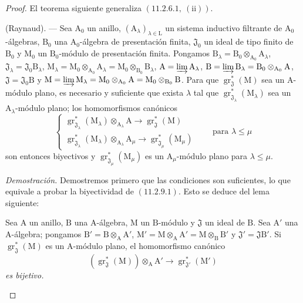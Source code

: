 \begin{proof}
El teorema siguiente generaliza $(11.2.6.1,~(\mathrm{ii}))$.

\begin{theorem}[11.2.9]
\label{IV.11.2.9}
(Raynaud). --- Sea $\mathrm{A}_0$ un anillo, $(\mathrm{A}_\lambda)_{\lambda\in\mathrm{L}}$ un sistema inductivo filtrante de $\mathrm{A}_0$-álgebras, $\mathrm{B}_0$ una $\mathrm{A}_0$-álgebra de presentación finita, $\mathfrak{J}_0$ un ideal de tipo finito de $\mathrm{B}_0$ y $\mathrm{M}_0$ un $\mathrm{B}_0$-módulo de presentación finita. Pongamos $\mathrm{B}_\lambda=\mathrm{B}_0\otimes_{\mathrm{A}_0}\mathrm{A}_\lambda$, $\mathfrak{J}_\lambda=\mathfrak{J}_0\mathrm{B}_\lambda$, $\mathrm{M}_\lambda=\mathrm{M}_0\otimes_{\mathrm{A}_0}\mathrm{A}_\lambda=\mathrm{M}_0\otimes_{\mathrm{B}_0}\mathrm{B}_\lambda$, $\mathrm{A}=\varinjlim\mathrm{A}_\lambda$, $\mathrm{B}=\varinjlim\mathrm{B}_\lambda=\mathrm{B}_0\otimes_{\mathrm{A}_0}\mathrm{A}$, $\mathfrak{J}=\mathfrak{J}_0\mathrm{B}$ y $\mathrm{M}=\varinjlim\mathrm{M}_\lambda=\mathrm{M}_0\otimes_{\mathrm{A}_0}\mathrm{A}=\mathrm{M}_0\otimes_{\mathrm{B}_0}\mathrm{B}$. Para que $\operatorname{gr}^*_\mathfrak{J}(\mathrm{M})$ sea un $\mathrm{A}$-módulo plano, es necesario y suficiente que exista $\lambda$ tal que $\operatorname{gr}^*_{\mathfrak{J}_\lambda}(\mathrm{M}_\lambda)$ sea un $\mathrm{A}_\lambda$-módulo plano; los homomorfismos canónicos
\begin{equation}
  \begin{cases}
    \operatorname{gr}^*_{\mathfrak{J}_\lambda}(\mathrm{M}_\lambda)\otimes_{\mathrm{A}_\lambda}\mathrm{A} \to \operatorname{gr}^*_\mathfrak{J}(\mathrm{M}) \\
    \operatorname{gr}^*_{\mathfrak{J}_\lambda}(\mathrm{M}_\lambda)\otimes_{\mathrm{A}_\lambda}\mathrm{A}_\mu \to \operatorname{gr}^*_{\mathfrak{J}_\mu}(\mathrm{M}_\mu)
  \end{cases}
  \qquad\text{para }\lambda\leqslant\mu
  \label{IV.11.2.9.1}
\tag{11.2.9.1}
\end{equation}
son entonces biyectivos y $\operatorname{gr}^*_{\mathfrak{J}_\mu}(\mathrm{M}_\mu)$ es un $\mathrm{A}_\mu$-módulo plano para $\lambda\leqslant\mu$.
\end{theorem}

\medskip
\noindent\emph{Demostración.}
Demostremos primero que las condiciones son suficientes, lo que equivale a probar
la biyectividad de $(11.2.9.1)$. Esto se deduce del lema siguiente:

\begin{lemma}[11.2.9.2]
\label{IV.11.2.9.2}
Sea $\mathrm{A}$ un anillo, $\mathrm{B}$ una $\mathrm{A}$-álgebra, $\mathrm{M}$ un $\mathrm{B}$-módulo y $\mathfrak{J}$ un ideal de $\mathrm{B}$. Sea $\mathrm{A}'$ una $\mathrm{A}$-álgebra; pongamos $\mathrm{B}'=\mathrm{B}\otimes_\mathrm{A}\mathrm{A}'$, $\mathrm{M}'=\mathrm{M}\otimes_\mathrm{A}\mathrm{A}'=\mathrm{M}\otimes_\mathrm{B}\mathrm{B}'$ y $\mathfrak{J}'=\mathfrak{J}\mathrm{B}'$. Si $\operatorname{gr}^*_\mathfrak{J}(\mathrm{M})$ es un $\mathrm{A}$-módulo plano, el homomorfismo canónico
\[
  (\operatorname{gr}^*_\mathfrak{J}(\mathrm{M}))\otimes_\mathrm{A}\mathrm{A}'\to\operatorname{gr}^*_{\mathfrak{J}'}(\mathrm{M}')
\]
\emph{es bijetivo.}
\end{lemma}


\end{proof}
